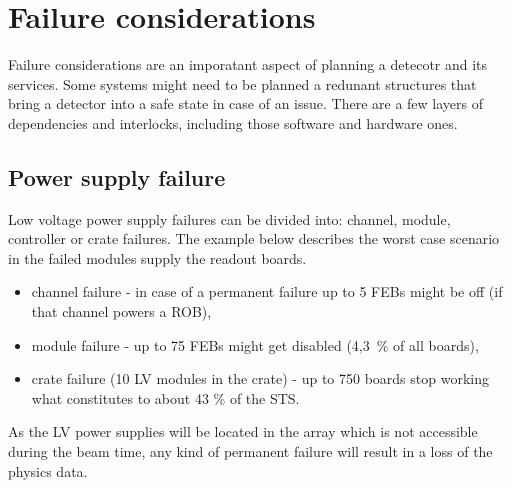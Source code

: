 \section{Failure considerations}

Failure considerations are an imporatant aspect of planning a detecotr and its services. Some systems might need to be planned a redunant structures that bring a detector into a safe state in case of an issue. There are a few layers of dependencies and interlocks, including those software and hardware ones.

\subsection{Power supply failure}
Low voltage power supply failures can be divided into: channel, module, controller or crate failures. The example below describes the worst case scenario in the failed modules supply the readout boards.

\begin{itemize}
    \item channel failure - in case of a permanent failure up to 5 \gls{FEB}s might be off (if that channel powers a \gls{ROB}),
    \item module failure - up to 75 \gls{FEB}s might get disabled (4,3~\% of all boards), 
    \item crate failure (10 LV modules in the crate) - up to 750 boards stop working what constitutes to about 43 \% of the STS.
\end{itemize}

As the LV power supplies will be located in the array which is not accessible during the beam time, any kind of permanent failure will result in a loss of the physics data. 